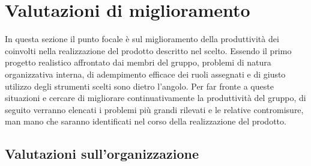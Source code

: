 \section{Valutazioni di miglioramento}
In questa sezione il punto focale è sul miglioramento della produttività dei  coinvolti nella realizzazione del prodotto descritto nel  scelto. Essendo il primo progetto realistico affrontato dai membri del gruppo, problemi di natura organizzativa interna, di adempimento efficace dei ruoli assegnati e di giusto utilizzo degli strumenti scelti sono dietro l'angolo. Per far fronte a queste situazioni e cercare di migliorare continuativamente la produttività del gruppo, di seguito verranno elencati i problemi più grandi rilevati e le relative contromisure, man mano che saranno identificati nel corso della realizzazione del prodotto.

	\subsection{Valutazioni sull'organizzazione}
  

